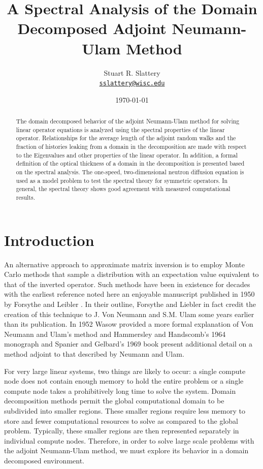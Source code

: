 \documentclass[letterpaper,12pt]{article}
\author{Stuart R. Slattery
  \\ \href{mailto:sslattery@wisc.edu}{\texttt{sslattery@wisc.edu}}
}
\date{\today}
\title{A Spectral Analysis of the Domain Decomposed Adjoint
  Neumann-Ulam Method}
\begin{document}
\maketitle

\begin{abstract}

  The domain decomposed behavior of the adjoint Neumann-Ulam method
  for solving linear operator equations is analyzed using the spectral
  properties of the linear operator. Relationships for the average
  length of the adjoint random walks and the fraction of histories
  leaking from a domain in the decomposition are made with respect to
  the Eigenvalues and other properties of the linear operator. In
  addition, a formal definition of the optical thickness of a domain
  in the decomposition is presented based on the spectral
  analysis. The one-speed, two-dimensional neutron diffusion equation
  is used as a model problem to test the spectral theory for symmetric
  operators. In general, the spectral theory shows good agreement with
  measured computational results.

\end{abstract}

\section{Introduction}
An alternative approach to approximate matrix inversion is to employ
Monte Carlo methods that sample a distribution with an expectation
value equivalent to that of the inverted operator. Such methods have
been in existence for decades with the earliest reference noted here
an enjoyable manuscript published in 1950 by Forsythe and Leibler
\cite{forsythe_matrix_1950}. In their outline, Forsythe and Liebler
in fact credit the creation of this technique to J. Von Neumann and
S.M. Ulam some years earlier than its publication. In 1952 Wasow
provided a more formal explanation of Von Neumann and Ulam's method
\cite{wasow_note_1952} and Hammersley and Handscomb's 1964 monograph
\cite{hammersley_monte_1964} and Spanier and Gelbard's 1969 book
\cite{spanier_monte_1969} present additional detail on a method
adjoint to that described by Neumann and Ulam.

For very large linear systems, two things are likely to occur: a
single compute node does not contain enough memory to hold the entire
problem or a single compute node takes a prohibitively long time to
solve the system. Domain decomposition methods permit the global
computational domain to be subdivided into smaller regions. These
smaller regions require less memory to store and fewer computational
resources to solve as compared to the global problem. Typically, these
smaller regions are then represented separately in individual compute
nodes. Therefore, in order to solve large scale problems with the
adjoint Neumann-Ulam method, we must explore its behavior in a domain
decomposed environment.
\end{document}
